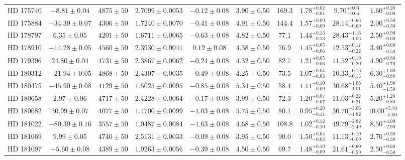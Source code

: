 \begin{table*}
\begin{tabular}{cccccccccc}
HD 175740 & $-8.81 \pm 0.04$ & $4875 \pm 50$ & $2.7099 \pm 0.0053$ & $-0.12 \pm 0.08$ & $3.90 \pm 0.50$ & 169.3 & $1.78^{+0.02}_{-0.01}$ & $9.70^{+0.03}_{-0.04}$ & $1.60^{+0.20}_{-0.00}$ \\
HD 175884 & $-34.39 \pm 0.07$ & $4306 \pm 50$ & $1.7240 \pm 0.0070$ & $-0.41 \pm 0.08$ & $4.91 \pm 0.50$ & 144.4 & $1.57^{+0.09}_{-0.09}$ & $28.14^{+0.66}_{-0.69}$ & $2.00^{+0.50}_{-0.30}$ \\
HD 178797 & $6.35 \pm 0.05$ & $4201 \pm 50$ & $1.6711 \pm 0.0065$ & $-0.63 \pm 0.08$ & $4.82 \pm 0.50$ & 77.1 & $1.44^{+0.13}_{-0.13}$ & $28.43^{+1.16}_{-1.06}$ & $2.50^{+0.90}_{-0.60}$ \\
HD 178910 & $-14.28 \pm 0.05$ & $4560 \pm 50$ & $2.3930 \pm 0.0041$ & $0.12 \pm 0.08$ & $4.38 \pm 0.50$ & 76.9 & $1.45^{+0.05}_{-0.06}$ & $12.53^{+0.17}_{-0.22}$ & $3.40^{+0.60}_{-0.50}$ \\
HD 179396 & $24.80 \pm 0.04$ & $4731 \pm 50$ & $2.3867 \pm 0.0062$ & $-0.24 \pm 0.08$ & $4.32 \pm 0.50$ & 82.7 & $1.21^{+0.05}_{-0.06}$ & $11.52^{+0.19}_{-0.20}$ & $4.90^{+0.80}_{-0.70}$ \\
HD 180312 & $-21.94 \pm 0.05$ & $4868 \pm 50$ & $2.4307 \pm 0.0035$ & $-0.49 \pm 0.08$ & $4.25 \pm 0.50$ & 73.5 & $1.07^{+0.04}_{-0.03}$ & $10.33^{+0.16}_{-0.13}$ & $6.30^{+1.30}_{-0.80}$ \\
HD 180475 & $-45.90 \pm 0.08$ & $4129 \pm 50$ & $1.5025 \pm 0.0095$ & $-0.85 \pm 0.08$ & $5.34 \pm 0.50$ & 58.4 & $1.11^{+0.10}_{-0.09}$ & $30.68^{+1.06}_{-1.01}$ & $5.40^{+1.90}_{-1.50}$ \\
HD 180658 & $2.97 \pm 0.06$ & $4717 \pm 50$ & $2.4228 \pm 0.0064$ & $-0.17 \pm 0.08$ & $3.99 \pm 0.50$ & 72.3 & $1.20^{+0.07}_{-0.07}$ & $11.03^{+0.22}_{-0.21}$ & $5.20^{+1.20}_{-0.80}$ \\
HD 180682 & $30.99 \pm 0.07$ & $4077 \pm 50$ & $1.4700 \pm 0.0099$ & $-1.03 \pm 0.08$ & $5.75 \pm 0.50$ & 80.1 & $0.95^{+0.20}_{-0.11}$ & $30.70^{+3.06}_{-1.82}$ & $10.00^{+5.70}_{-5.00}$ \\
HD 181022 & $-80.39 \pm 0.16$ & $3557 \pm 50$ & $1.0487 \pm 0.0084$ & $-1.63 \pm 0.08$ & $4.68 \pm 0.50$ & 108.8 & $1.02^{+0.12}_{-0.10}$ & $49.79^{+2.82}_{-2.49}$ & $8.50^{+4.00}_{-2.90}$ \\
HD 181069 & $9.99 \pm 0.05$ & $4740 \pm 50$ & $2.5131 \pm 0.0033$ & $-0.09 \pm 0.08$ & $3.95 \pm 0.50$ & 90.0 & $1.50^{+0.04}_{-0.03}$ & $11.13^{+0.10}_{-0.09}$ & $2.70^{+0.30}_{-0.30}$ \\
HD 181097 & $-5.60 \pm 0.08$ & $4389 \pm 50$ & $1.9263 \pm 0.0056$ & $-0.39 \pm 0.08$ & $4.50 \pm 0.50$ & 69.7 & $1.48^{+0.10}_{-0.09}$ & $21.61^{+0.60}_{-0.59}$ & $2.50^{+0.60}_{-0.50}$ \\

\end{tabular}
\end{table*}
